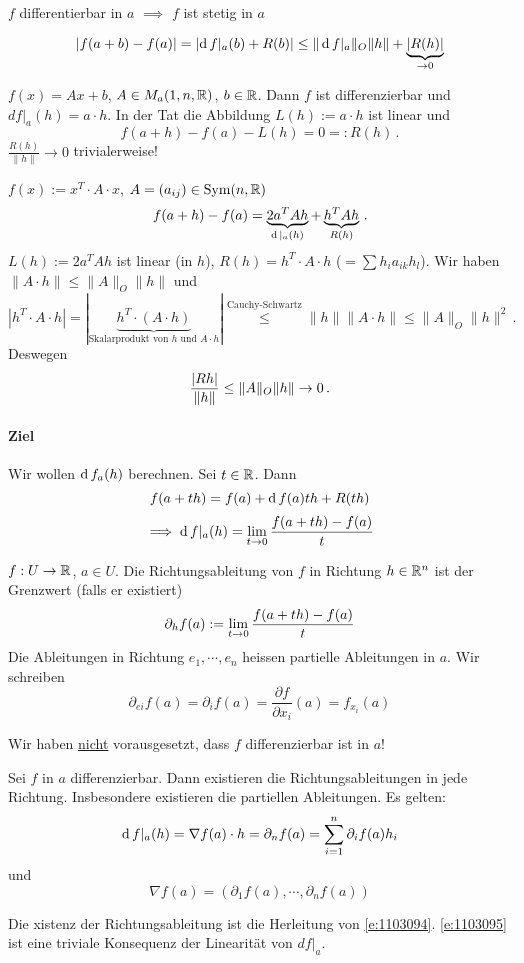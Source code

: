 \begin{Sat}
  $f$ differentierbar in $a$ $\implies$ $f$ ist stetig in $a$
\end{Sat}
\begin{Bew}
  \[\left| f(a+b)-f(a) \right|=\left| \operatorname{d} f|_a (b)+R(b) \right|\leq\|\operatorname{d} f|_a\|_O\|h\|+\underbrace{\left| R(h) \right|}_{\rightarrow 0}\]
\end{Bew}
\begin{Bsp}
  $f(x)=Ax+b$, $A\in M_a(1,n,\mathbb{R})$, $b\in\mathbb{R}$.
Dann $f$ ist differenzierbar und $df|_a (h) =a\cdot h$.
In der Tat die Abbildung $L (h) := a \cdot h$  ist linear und 
\[f(a+h)-f(a)-L (h)=0 =: R(h)\, .\]
$\frac{R(h)}{\|h\|}\to 0$ trivialerweise!
\end{Bsp}
\begin{Bsp}
  $f(x):=x^T\cdot A\cdot x$, $A=(a_{ij})\in\operatorname{Sym}(n,\mathbb{R})$
  \[f(a+h)-f(a) = \underbrace{2a^TAh}_{\operatorname{d}|_a (h)}+\underbrace{h^TAh}_{R(h)}\, .\]
  $L (h):=2a^TAh$ ist linear (in $h$), $R(h)=h^T\cdot A\cdot h$ ($=\sum h_ia_{ik}h_l$).
Wir haben $\|A\cdot h\|\leq \|A\|_O \|h\|$ und 
\[
|h^T\cdot A\cdot h| = |\underbrace{h^T\cdot (A\cdot h)}_{\text{Skalarprodukt von $h$ und $A\cdot h$}}|
\stackrel{\text{Cauchy-Schwartz}}{\leq} \|h\|\|A\cdot h\|\leq \|A\|_O \|h\|^2\, .
\]
Deswegen
\[
\frac{\left| Rh \right|}{\|h\|}\leq \|A\|_O \|h\| \rightarrow 0\, .
\]
\end{Bsp}
\paragraph{Ziel}
Wir wollen $\operatorname{d} f_a (h)$ berechnen. Sei $t\in\mathbb{R}$. Dann
\[f(a+th)=f(a)+\operatorname{d} f(a)th+R(th)\]
\begin{equation}
  \label{e:1103094}
  \implies \operatorname{d} f|_a (h)=\displaystyle\lim_{t\rightarrow0}\frac{f(a+th)-f(a)}{t}
\end{equation}
\begin{Def}
  $f:U\rightarrow\mathbb{R}$, $a\in U$. Die Richtungsableitung von $f$ in Richtung $h\in\mathbb{R}^n$ ist der Grenzwert (falls er existiert)
  \[\partial_hf(a):=\displaystyle\lim_{t\rightarrow0}\frac{f(a+th)-f(a)}{t}\]
  Die Ableitungen in Richtung $e_1,\cdots,e_n$ heissen partielle Ableitungen in $a$. Wir schreiben
  \[\partial_{ei}f(a)=\partial_if(a)=\frac{\partial f}{\partial x_i}(a)=f_{x_i}(a)\]
\end{Def}
\begin{Bem}
  Wir haben \ul{nicht} vorausgesetzt, dass $f$ differenzierbar ist in $a$!
\end{Bem}
\begin{Sat}
  Sei $f$ in $a$ differenzierbar. Dann existieren die Richtungsableitungen in jede Richtung. Insbesondere existieren die partiellen Ableitungen. Es gelten:
  \begin{equation}
    \label{e:1103095}
    \operatorname{d} f|_a (h)=\nabla f(a) \cdot h=\partial_nf(a)=\sum_{i=1}^n\partial_if(a)h_i
  \end{equation}
  und
  \[\nabla f (a)=\left( \partial_1f(a),\cdots,\partial_nf(a) \right)\]
\end{Sat}
\begin{Bew}
  Die xistenz der Richtungsableitung  ist die Herleitung von \ref{e:1103094}. \eqref{e:1103095} ist
eine triviale Konsequenz der Linearit\"at von $df|_a$.
\end{Bew}
